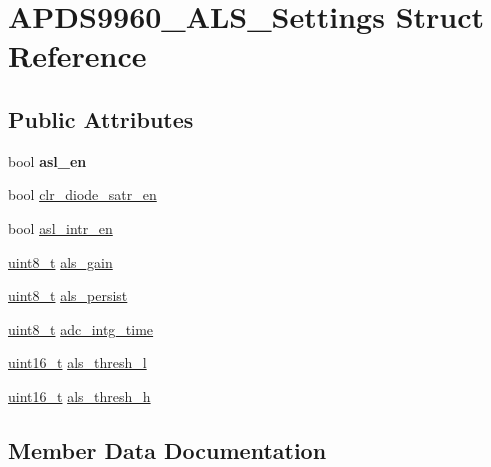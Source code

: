 \hypertarget{structAPDS9960__ALS__Settings}{}\section{A\+P\+D\+S9960\+\_\+\+A\+L\+S\+\_\+\+Settings Struct Reference}
\label{structAPDS9960__ALS__Settings}
\subsection*{Public Attributes}
\begin{DoxyCompactItemize}
\item 
\mbox{\label{structAPDS9960__ALS__Settings_ae7f4f25a49fa7e17b3bf0343228d57f8}} 
bool {\bfseries asl\+\_\+en}
\item 
bool \hyperlink{structAPDS9960__ALS__Settings_a884d6a1aba23674cb4722d14e2e41f6f}{clr\+\_\+diode\+\_\+satr\+\_\+en}
\item 
bool \hyperlink{structAPDS9960__ALS__Settings_a9fe68f158b9ed512801d6344ae0e345f}{asl\+\_\+intr\+\_\+en}
\item 
\hyperlink{vl53l0x__types_8h_aba7bc1797add20fe3efdf37ced1182c5}{uint8\+\_\+t} \hyperlink{structAPDS9960__ALS__Settings_adbc2a3d7172e0451c90e11e196c241d5}{als\+\_\+gain}
\item 
\hyperlink{vl53l0x__types_8h_aba7bc1797add20fe3efdf37ced1182c5}{uint8\+\_\+t} \hyperlink{structAPDS9960__ALS__Settings_a36d6caae376181839fa2b288c9ca328d}{als\+\_\+persist}
\item 
\hyperlink{vl53l0x__types_8h_aba7bc1797add20fe3efdf37ced1182c5}{uint8\+\_\+t} \hyperlink{structAPDS9960__ALS__Settings_a9681be9a91aa906eeb398645f94becc0}{adc\+\_\+intg\+\_\+time}
\item 
\hyperlink{vl53l0x__types_8h_a273cf69d639a59973b6019625df33e30}{uint16\+\_\+t} \hyperlink{structAPDS9960__ALS__Settings_ad4e2846fe1592a7eb847a4a423ea0bb9}{als\+\_\+thresh\+\_\+l}
\item 
\hyperlink{vl53l0x__types_8h_a273cf69d639a59973b6019625df33e30}{uint16\+\_\+t} \hyperlink{structAPDS9960__ALS__Settings_a4c57f6e6fa364b5be74d3cff2d10aa4e}{als\+\_\+thresh\+\_\+h}
\end{DoxyCompactItemize}


\subsection{Member Data Documentation}
\mbox{\label{structAPDS9960__ALS__Settings_a9681be9a91aa906eeb398645f94becc0}} 
